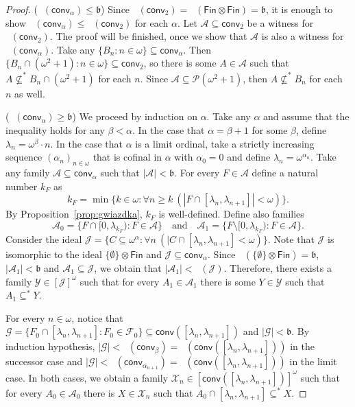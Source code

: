 \documentclass{amsart}
\theoremstyle{plain}
\theoremstyle{definition}
\theoremstyle{remark}
\newcommand{\cA}{\mathcal{A}}
\newcommand{\cG}{\mathcal{G}}
\newcommand{\cJ}{\mathcal{J}}
\newcommand{\J}{\cJ}
\newcommand{\cP}{\mathcal{P}}
\newcommand{\bnumber}{\mathfrak{b}}
\DeclareMathOperator{\add}{add}
\DeclareMathOperator{\addo}{\add^*_{\omega}}
\newcommand{\FIN}{\mathsf{Fin}}
\newcommand{\fin}{\FIN}
\newcommand{\finxfin}{\FIN\otimes\FIN}
\newcommand{\conv}{\mathsf{conv}}
\renewcommand{\subset}{\subseteq}
\begin{document}
\begin{proof}
    
    ($\addo(\conv_\alpha)\leq \bnumber$)  
    Since $\addo(\conv_2)= \addo(\finxfin)=\bnumber$,
    it is enough to show 
 $\addo(\conv_\alpha)\leq \addo(\conv_2)$ for each $\alpha$. Let $\cA\subset \conv_2$ be a witness for $\addo(\conv_2)$. 
 The proof will be finished, once we show that $\cA$ is also 
 a witness for $\addo(\conv_\alpha)$. 
 Take any $\{B_n : n\in \omega\}\subset \conv_\alpha$. Then $\{B_n\cap(\omega^2+1): n\in \omega\} \subset \conv_2 $, so there is some $A\in \cA$ such that $A\not\subset^* B_n\cap (\omega^2+1) $ for each $n$.  Since $\cA\subset \cP(\omega^2+1)$, then $A\not\subset^* B_n $ for each $n$ as well.

      ($\addo(\conv_\alpha)\geq \bnumber$)  
    We proceed by induction on $\alpha$. Take any $\alpha$ and assume that the inequality  holds for any $\beta < \alpha$.  
    In the case that $\alpha=\beta+1$ for some $\beta$, define $\lambda_n=\omega^\beta\cdot n$. In the case that $\alpha$ is a limit ordinal, take a strictly increasing sequence $(\alpha_n)_{n\in\omega}$ that is cofinal in $\alpha$ with $\alpha_0=0$ and define $\lambda_n=\omega^{\alpha_n}$.
     Take any family $\cA\subset\conv_\alpha$ such that $|\cA|<\bnumber$. For every $F\in\cA$ define a natural number $k_F$ as $$k_F=\min\{k\in\omega : \forall n\geq k \ ( |F\cap[\lambda_n, \lambda_{n+1}]|<\omega)\}. $$ By Proposition~\ref{prop:gwiazdka}, $k_F$ is well-defined. Define also families $$\cA_0=\{F \cap [0 , \lambda_{k_F}) : F\in\cA\} \quad \text{and} \quad  \cA_1=\{F\setminus [0,\lambda_{k_F}) : F\in \cA\}.$$ 
     Consider the ideal $\J=\{C\subset \omega^\alpha : \forall n \ (|C\cap [\lambda_n, \lambda_{n+1}]< \omega )\}.$ Note that $\J$ is isomorphic to the ideal $\{\emptyset\}\otimes\fin$ and $\J\subset \conv_\alpha$. Since $\addo(\{\emptyset\}\otimes\fin)=\bnumber$,  $|\cA_1|<\bnumber$ and $\cA_1\subseteq\cJ$,  we obtain that $|\cA_1|<\addo(\J)$. Therefore, there exists a family $\mathcal{Y}\in [\J]^\omega$ such that for every $A_1\in\cA_1$ there is some $Y\in \mathcal{Y}$ such that $A_1\subset^*Y$. 

     For every $n\in \omega $, notice that $\cG= \{F_0\cap[\lambda_n, \lambda_{n+1}] : F_0\in\mathcal{F}_0\} \subset \conv([\lambda_n, \lambda_{n+1}])$ and  $|\cG|< \bnumber$.
     By induction hypothesis,  $|\cG|<\addo(\conv_\beta)= \addo(\conv([\lambda_n, \lambda_{n+1}]))$ in the successor case and 
     $|\cG|<\addo(\conv_{\alpha_{n+1}})= \addo(\conv([\lambda_n, \lambda_{n+1}]))$ in the limit case. In both cases, we obtain a family  $\mathcal{X}_n\in [\conv([\lambda_n , \lambda_{n+1}])]^\omega$ such that for every $A_0\in\cA_0$ there is  $X\in\mathcal{X}_n$ such that $A_0\cap[\lambda_n , \lambda_{n+1}]\subset^*X$.


\end{proof}
\end{document}
